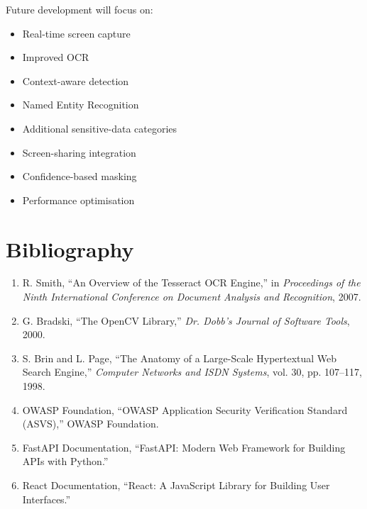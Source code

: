 \documentclass[12pt,a4paper]{tietreport}
\begin{document}
Future development will focus on:

\begin{itemize}
    \item Real-time screen capture
    \item Improved OCR
    \item Context-aware detection
    \item Named Entity Recognition
    \item Additional sensitive-data categories
    \item Screen-sharing integration
    \item Confidence-based masking
    \item Performance optimisation
\end{itemize}


\clearpage

\chapter*{Bibliography}

\begin{enumerate}

\item R. Smith, ``An Overview of the Tesseract OCR Engine,'' in
\textit{Proceedings of the Ninth International Conference on Document Analysis and Recognition}, 2007.

\item G. Bradski, ``The OpenCV Library,'' \textit{Dr. Dobb's Journal of Software Tools}, 2000.

\item S. Brin and L. Page, ``The Anatomy of a Large-Scale Hypertextual Web Search Engine,''
\textit{Computer Networks and ISDN Systems}, vol. 30, pp. 107--117, 1998.

\item OWASP Foundation, ``OWASP Application Security Verification Standard (ASVS),''
OWASP Foundation.

\item FastAPI Documentation, ``FastAPI: Modern Web Framework for Building APIs with Python.''

\item React Documentation, ``React: A JavaScript Library for Building User Interfaces.''

\end{enumerate}

\end{document}
